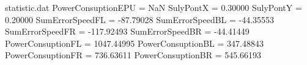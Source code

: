 \begin{filecontents*}{statistic.dat}
PowerConsuptionEPU =        NaN
SulyPontX =    0.30000
SulyPontY =    0.20000
SumErrorSpeedFL =  -87.79028
SumErrorSpeedBL =  -44.35553
SumErrorSpeedFR = -117.92493
SumErrorSpeedBR =  -44.41449
PowerConsuptionFL = 1047.44995
PowerConsuptionBL =  347.48843
PowerConsuptionFR =  736.63611
PowerConsuptionBR =  545.66193
\end{filecontents*}
